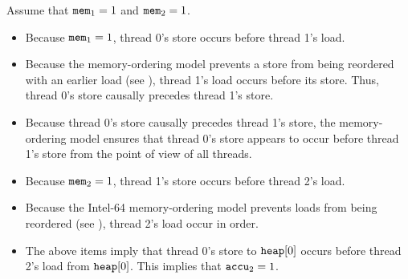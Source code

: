 \begin{table}[!hbt]
\noindent{}
\caption[Stores Are Transitively Visible]{Stores Are Transitively Visible \cite[Example 8-6]{ref:Intel}}
\label{tbl:litmus:intel:6}
\end{table}

\noindent
Assume that $\texttt{mem}_1 = 1$ and $\texttt{mem}_2 = 1$.
\begin{itemize}
  \item Because $\texttt{mem}_1 = 1$, thread 0’s store occurs before thread 1’s load.
  \item Because the memory-ordering model prevents a store from being reordered with an earlier load (see \cite[Section 8.2.3.3]{ref:Intel}), thread 1’s load occurs before its store. Thus, thread 0’s store causally precedes thread 1’s store.
  \item Because thread 0’s store causally precedes thread 1’s store, the memory-ordering model ensures that thread 0’s store appears to occur before thread 1’s store from the point of view of all threads.
  \item Because $\texttt{mem}_2 = 1$, thread 1’s store occurs before thread 2’s load.
  \item Because the Intel-64 memory-ordering model prevents loads from being reordered (see \cite[Section 8.2.3.2]{ref:Intel}), thread 2’s load occur in order.
  \item The above items imply that thread 0’s store to $\texttt{heap}[0]$ occurs before thread 2’s load from $\texttt{heap}[0]$. This implies that $\texttt{accu}_2 = 1$.
\end{itemize}

